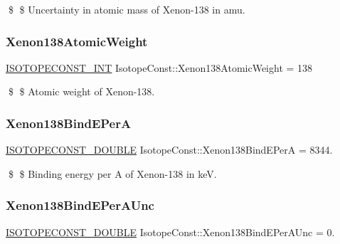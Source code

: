 \$ \$ Uncertainty in atomic mass of Xenon-\/138 in amu. \mbox{\label{group___isotope_const-_xenon-_xe138_gaa072842e29cc1d257b83290425cf8dd2}} 
\subsubsection{\texorpdfstring{Xenon138\+Atomic\+Weight}{Xenon138AtomicWeight}}
{\footnotesize\ttfamily \mbox{\hyperlink{group___isotope_const-_macros_ga5f18360b3e99483a35c32d789e62621c}{I\+S\+O\+T\+O\+P\+E\+C\+O\+N\+S\+T\+\_\+\+I\+NT}} Isotope\+Const\+::\+Xenon138\+Atomic\+Weight = 138}

\$ \$ Atomic weight of Xenon-\/138. \mbox{\label{group___isotope_const-_xenon-_xe138_ga655ee6fb34ffaa8a74b4888d2879ce6a}} 
\subsubsection{\texorpdfstring{Xenon138\+Bind\+E\+PerA}{Xenon138BindEPerA}}
{\footnotesize\ttfamily \mbox{\hyperlink{group___isotope_const-_macros_ga8f45a7272ce02c0b4c65c44636ed719a}{I\+S\+O\+T\+O\+P\+E\+C\+O\+N\+S\+T\+\_\+\+D\+O\+U\+B\+LE}} Isotope\+Const\+::\+Xenon138\+Bind\+E\+PerA = 8344.}

\$ \$ Binding energy per A of Xenon-\/138 in keV. \mbox{\label{group___isotope_const-_xenon-_xe138_gabf9cb38e723a131a6443a84b5974d67a}} 
\subsubsection{\texorpdfstring{Xenon138\+Bind\+E\+Per\+A\+Unc}{Xenon138BindEPerAUnc}}
{\footnotesize\ttfamily \mbox{\hyperlink{group___isotope_const-_macros_ga8f45a7272ce02c0b4c65c44636ed719a}{I\+S\+O\+T\+O\+P\+E\+C\+O\+N\+S\+T\+\_\+\+D\+O\+U\+B\+LE}} Isotope\+Const\+::\+Xenon138\+Bind\+E\+Per\+A\+Unc = 0.}

